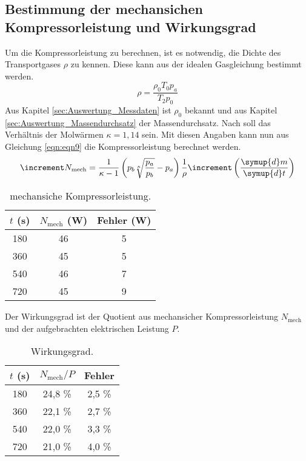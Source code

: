\subsection{Bestimmung der mechansichen Kompressorleistung und Wirkungsgrad}
\label{sec:Auswertung_Leistung}

Um die Kompressorleistung zu berechnen, ist es notwendig, die Dichte des Transportgases $\rho$ zu kennen.
Diese kann aus der idealen Gasgleichung bestimmt werden.
\begin{equation}
 \rho = \frac{\rho_0 T_0 p_a}{T_2 p_0}
 \label{eqn:gl14}
\end{equation}
Aus Kapitel \ref{sec:Auswertung_Messdaten} ist $\rho_0$ bekannt und aus Kapitel \ref{sec:Auswertung_Massendurchsatz} der Massendurchsatz.
Nach \cite{AnleitungV206} soll das Verhältnis der Molwärmen $\kappa = 1,14$ sein.
Mit diesen Angaben kann nun aus Gleichung \eqref{eqn:eqn9} die Kompressorleistung berechnet werden.
\begin{equation}
  \increment N_\text{mech} = \frac{1}{\kappa - 1} \left( p_b \sqrt[\kappa]{\frac{p_a}{p_b}} - p_a \right) \frac{1}{\rho} \increment \left(\frac{\symup{d}m}{\symup{d}t}\right)
  \label{eqn:gl15}
\end{equation}
\begin{table}
  \centering
  \caption{mechansiche Kompressorleistung.}
  \label{tab:Leistung}
  \begin{tabular}{c c c}
    \toprule
    $t$ (s) & $N_{\text{mech}}$ (W) & Fehler (W) \\
    \midrule
    180 & 46 & 5 \\
    360 & 45 & 5 \\
    540 & 46 & 7 \\
    720 & 45 & 9 \\
    \bottomrule
  \end{tabular}
\end{table}
\FloatBarrier
\noindent
Der Wirkungsgrad ist der Quotient aus mechansicher Kompressorleistung $N_\text{mech}$ und der aufgebrachten elektrischen Leistung $P$.
\begin{table}
  \centering
  \caption{Wirkungsgrad.}
  \label{tab:Wirkungsgrad}
  \begin{tabular}{c c c}
    \toprule
    $t$ (s) & $N_{\text{mech}}/P$ & Fehler \\
    \midrule
    180 & 24,8 \% & 2,5 \% \\
    360 & 22,1 \% & 2,7 \% \\
    540 & 22,0 \% & 3,3 \% \\
    720 & 21,0 \% & 4,0 \% \\
    \bottomrule
  \end{tabular}
\end{table}
